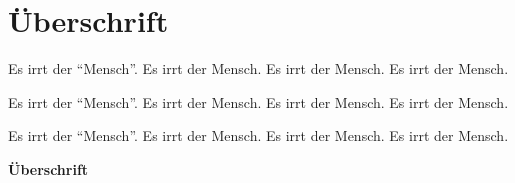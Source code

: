 \documentclass[a4paper,10pt, ngerman]{scrartcl}
\begin{document}
\section{Überschrift}

Es irrt der "`Mensch"'. Es irrt der Mensch. Es irrt der Mensch. Es irrt der Mensch.

{\sffamily
Es irrt der "`Mensch"'. Es irrt der Mensch. Es irrt der Mensch. Es irrt der Mensch.}

Es irrt der "`Mensch"'. Es irrt der Mensch. Es irrt der Mensch. Es irrt der Mensch.

\bigskip
\textbf{\rmfamily\Large Überschrift}
\end{document}
